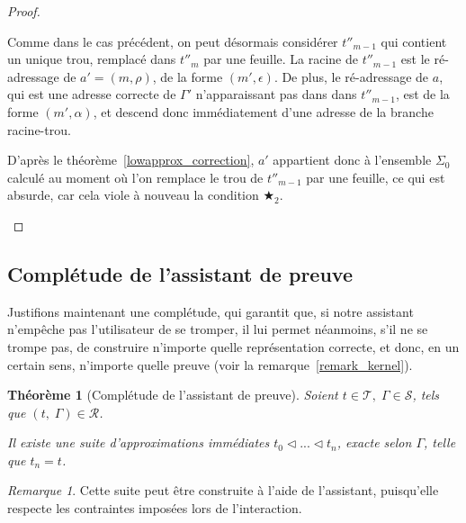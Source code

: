 \documentclass[11pt,a4paper]{article}
\theoremstyle{plain}
\newtheorem{theorem}{Théorème}
\theoremstyle{definition}
\theoremstyle{remark}
\newtheorem{remark}{Remarque}
\newcommand*{\sequent}{\Gamma}
\newcommand*{\sequents}{\ensuremath{\mathcal{S}}}
\newcommand*{\trees}{\ensuremath{\mathcal{T}}}
\newcommand*{\representations}{\ensuremath{\mathcal{R}}}
\newcommand*{\relapprox}{\ensuremath{\triangleleft}}
\newcommand*{\lowapprox}{\ensuremath{\Sigma_0}}
\newcommand*{\exactcondbis}{\bigstar_2}
\begin{document}
\begin{proof}
\begin{description}
        Comme dans le cas précédent, on peut désormais considérer $t''_{m-1}$ qui contient un unique trou, remplacé dans $t''_m$ par une feuille. La racine de $t''_{m-1}$ est le ré-adressage de $a' = (m, \rho)$, de la forme $(m', \epsilon)$. De plus, le ré-adressage de $a$, qui est une adresse correcte de $\sequent'$ n'apparaissant pas dans dans $t''_{m-1}$, est de la forme $(m', \alpha)$, et descend donc immédiatement d'une adresse de la branche racine-trou.

        D'après le théorème~\ref{lowapprox_correction}, $a'$ appartient donc à l'ensemble $\lowapprox$ calculé au moment où l'on remplace le trou de $t''_{m-1}$ par une feuille, ce qui est absurde, car cela viole à nouveau la condition $\exactcondbis$.
    \end{description}
\end{proof}

\subsection{Complétude de l'assistant de preuve}

Justifions maintenant une complétude, qui garantit que, si notre assistant n'empêche pas l'utilisateur de se tromper, il lui permet néanmoins, s'il ne se trompe pas, de construire n'importe quelle représentation correcte, et donc, en un certain sens, n'importe quelle preuve (voir la remarque~\ref{remark_kernel}).

\begin{theorem}[Complétude de l'assistant de preuve]
    \label{completeness}
    Soient $t \in \trees, \; \sequent \in \sequents$, tels que $(t, \; \sequent) \in \representations$.

    Il existe une suite d'approximations immédiates $t_0 \relapprox ... \relapprox t_n$, exacte selon $\sequent$, telle que $t_n = t$.
\end{theorem}

\begin{remark}
    Cette suite peut être construite à l'aide de l'assistant, puisqu'elle respecte les contraintes imposées lors de l'interaction.
\end{remark}
\end{document}
